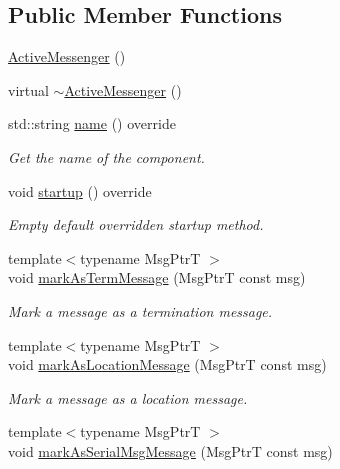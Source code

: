 \subsection*{Public Member Functions}
\begin{DoxyCompactItemize}
\item 
\hyperlink{structvt_1_1messaging_1_1_active_messenger_ab6b4f326bf77ec032d8ba86d51899c60}{Active\+Messenger} ()
\item 
virtual \hyperlink{structvt_1_1messaging_1_1_active_messenger_a10ef2a3dae9bcaddaa1f80903274e7b3}{$\sim$\+Active\+Messenger} ()
\item 
std\+::string \hyperlink{structvt_1_1messaging_1_1_active_messenger_a42112dea411907ca529bd5bc6586249a}{name} () override
\begin{DoxyCompactList}\small\item\em Get the name of the component. \end{DoxyCompactList}\item 
void \hyperlink{structvt_1_1messaging_1_1_active_messenger_a14656b543cdd9b1e52ce7772b6d5b99b}{startup} () override
\begin{DoxyCompactList}\small\item\em Empty default overridden startup method. \end{DoxyCompactList}\item 
{\footnotesize template$<$typename Msg\+PtrT $>$ }\\void \hyperlink{structvt_1_1messaging_1_1_active_messenger_ad76f4f0ee9830f4431b57720163f715c}{mark\+As\+Term\+Message} (Msg\+PtrT const msg)
\begin{DoxyCompactList}\small\item\em Mark a message as a termination message. \end{DoxyCompactList}\item 
{\footnotesize template$<$typename Msg\+PtrT $>$ }\\void \hyperlink{structvt_1_1messaging_1_1_active_messenger_ae813b0555258b09de8fa324ed98dcd02}{mark\+As\+Location\+Message} (Msg\+PtrT const msg)
\begin{DoxyCompactList}\small\item\em Mark a message as a location message. \end{DoxyCompactList}\item 
{\footnotesize template$<$typename Msg\+PtrT $>$ }\\void \hyperlink{structvt_1_1messaging_1_1_active_messenger_ae4f8d48cda11b13d4447ab253ff18bf2}{mark\+As\+Serial\+Msg\+Message} (Msg\+PtrT const msg)

\end{DoxyCompactItemize}
